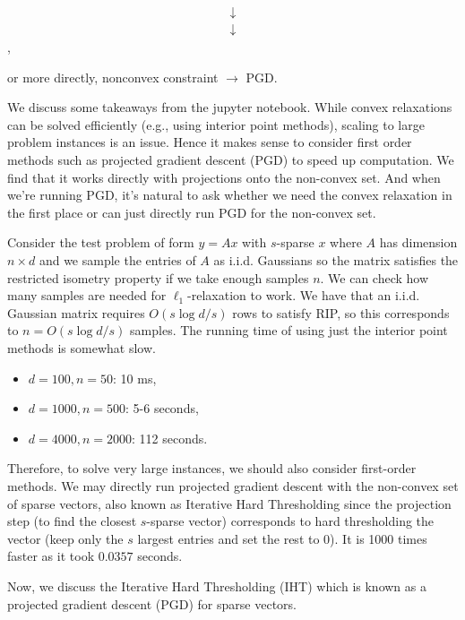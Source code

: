 \begin{align*}
\downarrow
\end{align*}
\begin{align*}
\downarrow
\end{align*}
,

or more directly, nonconvex constraint $\rightarrow$ PGD.  


We discuss some takeaways from the jupyter notebook. 
While convex relaxations can be solved efficiently (e.g., using interior point methods), scaling to large problem instances is an issue. Hence it makes sense to consider first order methods such as projected gradient descent (PGD) to speed up computation. We find that it works directly with projections onto the non-convex set. And when we're running PGD, it's natural to ask whether we need the convex relaxation in the first place or can just directly run PGD for the non-convex set.

Consider the test problem of form $y = Ax$ with $s$-sparse $x$ where $A$ has dimension $n \times d$ and we sample the entries of $A$ as i.i.d. Gaussians so the matrix satisfies the restricted isometry property if we take enough samples $n$. 
We can check how many samples are needed for $\ell_1$-relaxation to work. We have that an i.i.d. Gaussian matrix requires $O(s \log d/s)$ rows to satisfy RIP, so this corresponds to $n = O(s \log d/s)$ samples. 
The running time of using just the interior point methods is somewhat slow. 
\begin{itemize}
\item $d=100, n=50$: 10 ms, 
\item $d=1000, n=500$: 5-6 seconds,
\item $d=4000, n=2000$: 112 seconds. 
\end{itemize}

Therefore, to solve very large instances, we should also consider first-order methods. We may directly run projected gradient descent with the non-convex set of sparse vectors, also known as Iterative Hard Thresholding since the projection step (to find the closest $s$-sparse vector) corresponds to hard thresholding the vector (keep only the $s$ largest entries and set the rest to 0). It is 1000 times faster as it took $0.0357$ seconds.  




Now, we discuss the Iterative Hard Thresholding (IHT) which is known as a projected gradient descent (PGD) for sparse vectors.


